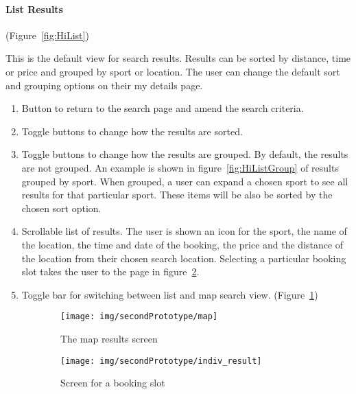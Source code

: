\paragraph{List Results} (Figure~\ref{fig:HiList})


This is the default view for search results. Results can be sorted
by distance, time or price and grouped by sport or location. The user
can change the default sort and grouping options on their my details
page.
\begin{enumerate}
	\item Button to return to the search page and amend the search criteria.
	\item Toggle buttons to change how the results are sorted.
	\item Toggle buttons to change how the results are grouped. By default,
		the results are not grouped. An example is shown in figure~\ref{fig:HiListGroup}
		of results grouped by sport. When grouped, a user can expand a chosen
		sport to see all results for that particular sport. These items will
		be also be sorted by the chosen sort option.
	\item Scrollable list of results. The user is shown an icon for the sport,
		the name of the location, the time and date of the booking, the price
		and the distance of the location from their chosen search location.
		Selecting a particular booking slot takes the user to the page in
		figure~\ref{fig:HiIndResult}.
	\item Toggle bar for switching between list and map search view. (Figure~\ref{fig:HiMap})
\end{enumerate}

\begin{figure}[htbp]
	\centering
	\begin{subfigure}[b]{0.45\textwidth}
		\texttt{[image: img/secondPrototype/map]}
		\caption{The map results screen}\label{fig:HiMap}
	\end{subfigure}%
	\qquad
	\begin{subfigure}[b]{0.45\textwidth}
		\texttt{[image: img/secondPrototype/indiv\_result]}
		\caption{Screen for a booking slot}\label{fig:HiIndResult}
	\end{subfigure}
	\caption{}\label{fig:MapResult}
\end{figure}

